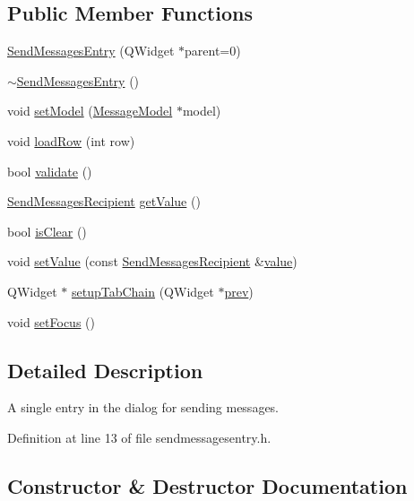 \subsection*{Public Member Functions}
\begin{DoxyCompactItemize}
\item 
\hyperlink{class_send_messages_entry_aa128a621a55f41387ff68f7df91bde3e}{Send\+Messages\+Entry} (Q\+Widget $\ast$parent=0)
\item 
\hyperlink{class_send_messages_entry_acbe470e8ec471cbe634292426ee7b8e2}{$\sim$\+Send\+Messages\+Entry} ()
\item 
void \hyperlink{class_send_messages_entry_a93adeed318df631928585bb18881742c}{set\+Model} (\hyperlink{class_message_model}{Message\+Model} $\ast$model)
\item 
void \hyperlink{class_send_messages_entry_acbd2feb39297973eb49134842d8491a4}{load\+Row} (int row)
\item 
bool \hyperlink{class_send_messages_entry_a160527f36e213eca216d57f48cc479ce}{validate} ()
\item 
\hyperlink{class_send_messages_recipient}{Send\+Messages\+Recipient} \hyperlink{class_send_messages_entry_a677153f3710be710ce60749b7aab76c1}{get\+Value} ()
\item 
bool \hyperlink{class_send_messages_entry_ab41f30f5ee43f39d58dd2b7262e62b2b}{is\+Clear} ()
\item 
void \hyperlink{class_send_messages_entry_a6ddbc264a5c6cd354cdc1a321e1d9762}{set\+Value} (const \hyperlink{class_send_messages_recipient}{Send\+Messages\+Recipient} \&\hyperlink{cache_8cc_a0f61d63b009d0880a89c843bd50d8d76}{value})
\item 
Q\+Widget $\ast$ \hyperlink{class_send_messages_entry_a6563b5ba4a38fdf2064e13d2793b4dbc}{setup\+Tab\+Chain} (Q\+Widget $\ast$\hyperlink{cache_8cc_aabbd2f01bb8ec4a7a0128bce5f8cdb1b}{prev})
\item 
void \hyperlink{class_send_messages_entry_a4dd4bb2554c58e9e534e57d7ac2be3a0}{set\+Focus} ()
\end{DoxyCompactItemize}


\subsection{Detailed Description}
A single entry in the dialog for sending messages. 

Definition at line 13 of file sendmessagesentry.\+h.



\subsection{Constructor \& Destructor Documentation}
\hypertarget{class_send_messages_entry_aa128a621a55f41387ff68f7df91bde3e}{}
